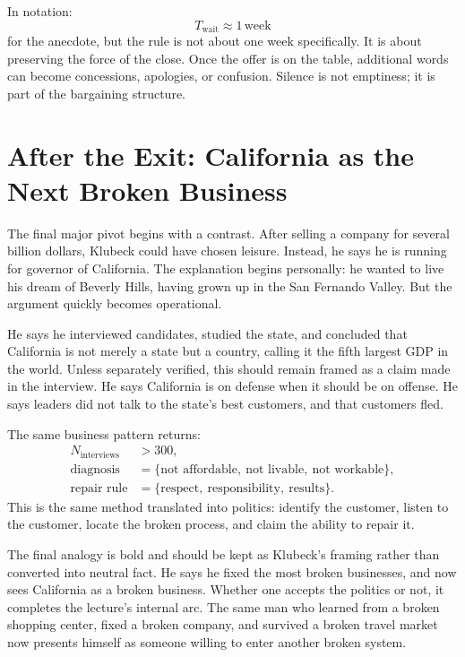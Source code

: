 In notation:
\begin{equation}
T_{\text{wait}}\approx 1\,\text{week}
\end{equation}
for the anecdote, but the rule is not about one week specifically. It is about preserving the force of the close. Once the offer is on the table, additional words can become concessions, apologies, or confusion. Silence is not emptiness; it is part of the bargaining structure.

\section{After the Exit: California as the Next Broken Business}

The final major pivot begins with a contrast. After selling a company for several billion dollars, Klubeck could have chosen leisure. Instead, he says he is running for governor of California. The explanation begins personally: he wanted to live his dream of Beverly Hills, having grown up in the San Fernando Valley. But the argument quickly becomes operational.

He says he interviewed candidates, studied the state, and concluded that California is not merely a state but a country, calling it the fifth largest GDP in the world. Unless separately verified, this should remain framed as a claim made in the interview. He says California is on defense when it should be on offense. He says leaders did not talk to the state's best customers, and that customers fled.

The same business pattern returns:
\begin{align}
N_{\text{interviews}} &> 300,\\
\text{diagnosis} &= \{\text{not affordable},\ \text{not livable},\ \text{not workable}\},\\
\text{repair rule} &= \{\text{respect},\ \text{responsibility},\ \text{results}\}.
\end{align}
This is the same method translated into politics: identify the customer, listen to the customer, locate the broken process, and claim the ability to repair it.

The final analogy is bold and should be kept as Klubeck's framing rather than converted into neutral fact. He says he fixed the most broken businesses, and now sees California as a broken business. Whether one accepts the politics or not, it completes the lecture's internal arc. The same man who learned from a broken shopping center, fixed a broken company, and survived a broken travel market now presents himself as someone willing to enter another broken system.

